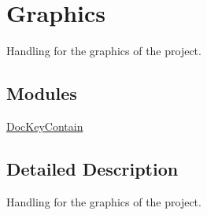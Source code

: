 \hypertarget{group___graphics}{}\section{Graphics}
\label{group___graphics}


Handling for the graphics of the project.  


\subsection*{Modules}
\begin{DoxyCompactItemize}
\item 
\hyperlink{group___doc_key_contain}{Doc\+Key\+Contain}
\begin{DoxyCompactList}\small\item\em \end{DoxyCompactList}\end{DoxyCompactItemize}


\subsection{Detailed Description}
Handling for the graphics of the project. 


